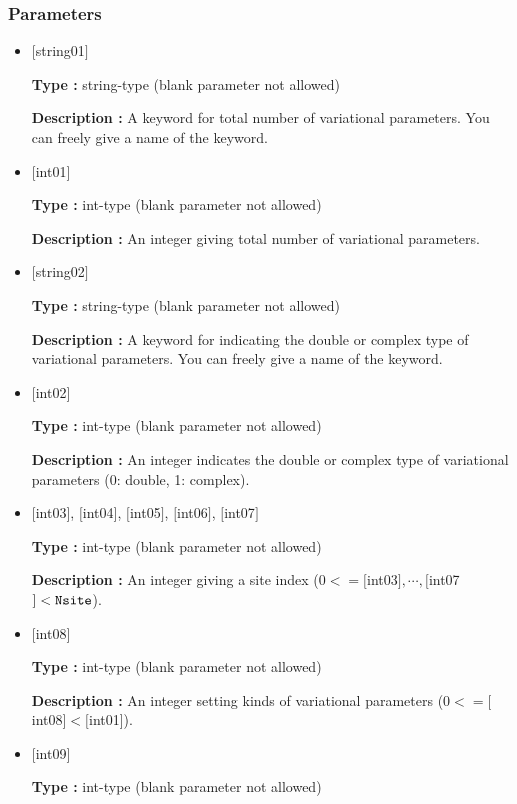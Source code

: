\subsubsection{Parameters}
 \begin{itemize}

   \item  $[$string01$]$
   
    {\bf Type :} string-type (blank parameter not allowed)

   {\bf Description :} A keyword for total number of variational parameters. You can freely give a name of the keyword. 

   \item  $[$int01$]$
   
    {\bf Type :} int-type (blank parameter not allowed)

   {\bf Description :}  An integer giving total number of variational parameters.

   \item  $[$string02$]$
   
    {\bf Type :} string-type (blank parameter not allowed)

   {\bf Description :}  A keyword for indicating the double or complex type of variational parameters. You can freely give a name of the keyword.

   \item  $[$int02$]$
   
    {\bf Type :} int-type (blank parameter not allowed)

   {\bf Description :} An integer indicates the double or complex type of variational parameters (0: double, 1: complex). 

  \item   $[$int03$]$,  $[$int04$]$, $[$int05$]$, $[$int06$]$, $[$int07$]$
   
 {\bf Type :} int-type (blank parameter not allowed)

{\bf Description :} An integer giving a site index ($0<= [$int03$], \cdots,  [$int07$]<\verb|Nsite|$).
 
 \item  $[$int08$]$
   
   {\bf Type :} int-type (blank parameter not allowed)

  {\bf Description :} An integer setting kinds of variational  parameters ($0<= [$int08$]<[$int01]). 

 \item  $[$int09$]$
   
   {\bf Type :} int-type (blank parameter not allowed)


\end{itemize}
